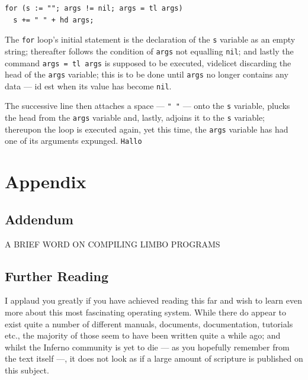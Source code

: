 \documentclass[a5paper,twoside,12pt]{report}
\begin{document}
\begin{lstlisting}
for (s := ""; args != nil; args = tl args)
  s += " " + hd args;
\end{lstlisting}

The \texttt{for} loop's initial statement is the declaration of the \texttt{s} variable as an empty string; thereafter follows the condition of \texttt{args} not equalling \texttt{nil}; and lastly the command \texttt{args = tl args} is supposed to be executed, videlicet discarding the head of the \texttt{args} variable; this is to be done until \texttt{args} no longer contains any data — id est when its value has become \texttt{nil}. 

The successive line then attaches a space — \texttt{" "} — onto the \texttt{s} variable, plucks the head from the \texttt{args} variable and, lastly, adjoins it to the \texttt{s} variable; thereupon the loop is executed again, yet this time, the \texttt{args} variable has had one of its arguments expunged.
\texttt{Hallo}

\newpage
\thispagestyle{empty}
  \mbox{}

\part*{Appendix}
  \newpage

\thispagestyle{empty}
  \mbox{}
  \newpage

\chapter*{Addendum}
  A BRIEF WORD ON COMPILING LIMBO PROGRAMS

\newpage

\chapter*{Further Reading}

I applaud you greatly if you have achieved reading this far and wish to learn even more about this most fascinating operating system. While there do appear to exist quite a number of different manuals, documents, documentation, tutorials etc., the majority of those seem to have been written quite a while ago; and whilst the Inferno community is yet to die — as you hopefully remember from the text itself —, it does not look as if a large amount of scripture is published on this subject. 
\end{document}

